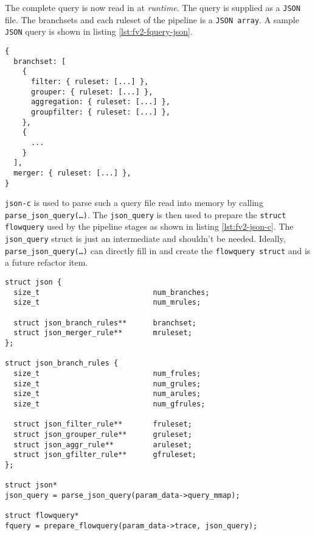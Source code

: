 The complete query is now read in at \emph{runtime}. The query is supplied as
a \texttt{JSON} file. The branchsets and each ruleset of the pipeline is a
\texttt{JSON array}.  A sample \texttt{JSON} query is shown in listing
\ref{lst:fv2-fquery-json}.

\begin{lstlisting}
{
  branchset: [
    {
      filter: { ruleset: [...] },
      grouper: { ruleset: [...] },
      aggregation: { ruleset: [...] },
      groupfilter: { ruleset: [...] },
    },
    {
      ...
    }
  ],
  merger: { ruleset: [...] },
}
\end{lstlisting}

\texttt{json-c} is used to parse such a query file read into memory by calling
\texttt{parse\_json\_query(\ldots)}. The \texttt{json\_query} is then used to
prepare the  \texttt{struct flowquery} used by
the pipeline stages as shown in listing \ref{lst:fv2-json-c}.  The
\texttt{json\_query} struct is just an intermediate and shouldn't be needed.
Ideally, \texttt{parse\_json\_query(\ldots)} can directly fill in and create
the \texttt{flowquery struct} and is a future refactor item.

\begin{lstlisting}
struct json {
  size_t                          num_branches;
  size_t                          num_mrules;

  struct json_branch_rules**      branchset;
  struct json_merger_rule**       mruleset;
};

struct json_branch_rules {
  size_t                          num_frules;
  size_t                          num_grules;
  size_t                          num_arules;
  size_t                          num_gfrules;

  struct json_filter_rule**       fruleset;
  struct json_grouper_rule**      gruleset;
  struct json_aggr_rule**         aruleset;
  struct json_gfilter_rule**      gfruleset;
};

struct json*
json_query = parse_json_query(param_data->query_mmap);

struct flowquery*
fquery = prepare_flowquery(param_data->trace, json_query);
\end{lstlisting}




